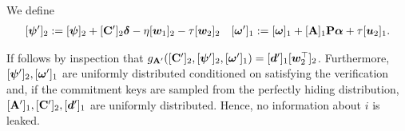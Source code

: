 We define
\begin{align}
&[{\boldsymbol{\psi}}']_2 := [{\boldsymbol{\psi}}]_2+[\mathbf{{C}}']_2{\boldsymbol{\delta}}-\eta[{\boldsymbol{w}}_1]_2-\tau[{\boldsymbol{w}}_2]_2
&[{\boldsymbol{\omega}}']_1 := [{\boldsymbol{\omega}}]_1 +[\mathbf{{A}}]_1\mathbf{{P}}{\boldsymbol{\alpha}} + \tau[{\boldsymbol{u}}_2]_1.
\label{eq:g-rerand-proofs}
\end{align}

If follows by inspection that $g_{\mathbf{{A}}'}([\mathbf{{C}}']_2,[{\boldsymbol{\psi}}']_2,[{\boldsymbol{\omega}}']_1) = [{\boldsymbol{d}}']_1[{\boldsymbol{w}}_2^\top]_2$. Furthermore, $[{\boldsymbol{\psi}}']_2,[{\boldsymbol{\omega}}']_1$ are uniformly distributed conditioned on satisfying the verification and, if
the commitment keys are sampled from the perfectly hiding distribution, $[\mathbf{{A}}']_1,[\mathbf{{C}}']_2,[{\boldsymbol{d}}']_1$ are uniformly distributed. Hence, no information about $i$ is leaked.

